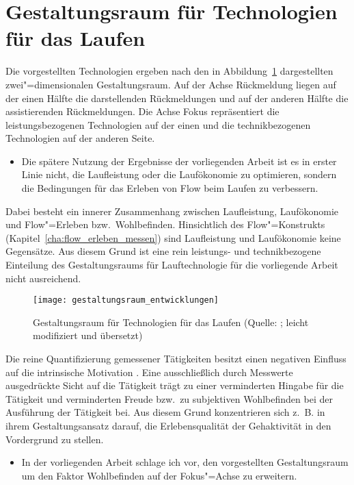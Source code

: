 

\section{Gestaltungsraum für Technologien für das Laufen} 

\label{sec:gestaltungsraum_fur_technologien_fur_das_laufen}

Die vorgestellten Technologien ergeben nach \citet{Jensen2014} den in Abbildung~\ref{fig:gestaltungsraum_entwicklungen} dargestellten zwei"=dimensionalen Gestaltungsraum. Auf der Achse Rückmeldung liegen auf der einen Hälfte die darstellenden Rückmeldungen und auf der anderen Hälfte die assistierenden Rückmeldungen. Die Achse Fokus repräsentiert die leistungsbezogenen Technologien auf der einen und die technikbezogenen Technologien auf der anderen Seite. 
\begin{itemize}
	
	\item Die spätere Nutzung der Ergebnisse der vorliegenden Arbeit ist es in erster Linie nicht, die Laufleistung oder die Laufökonomie zu optimieren, sondern die Bedingungen für das Erleben von Flow beim Laufen zu verbessern. 
\end{itemize}

Dabei besteht ein innerer Zusammenhang zwischen Laufleistung, Laufökonomie und Flow"=Erleben bzw.\ Wohlbefinden. Hinsichtlich des Flow"=Konstrukts (Kapitel~\ref{cha:flow_erleben_messen}) sind Laufleistung und Laufökonomie keine Gegensätze. Aus diesem Grund ist eine rein leistungs- und technikbezogene Einteilung des Gestaltungsraums für Lauftechnologie für die vorliegende Arbeit nicht ausreichend. 
\begin{figure}
	[!htb] \centering 
	\texttt{[image: gestaltungsraum\_entwicklungen]} \caption[Gestaltungsraum für Technologien für das Laufen]{Gestaltungsraum für Technologien für das Laufen (Quelle: \citet{Jensen2014}; leicht modifiziert und übersetzt)}\label{fig:gestaltungsraum_entwicklungen} 
\end{figure}

Die reine Quantifizierung gemessener Tätigkeiten besitzt einen negativen Einfluss auf die intrinsische Motivation \citep{Etkin2016}. Eine ausschließlich durch Messwerte ausgedrückte Sicht auf die Tätigkeit trägt zu einer verminderten Hingabe für die Tätigkeit und verminderten Freude bzw.\ zu subjektiven Wohlbefinden bei der Ausführung der Tätigkeit bei. Aus diesem Grund konzentrieren sich z.~B. \citet{Hajinejad2015} in ihrem Gestaltungsansatz darauf, die Erlebensqualität der Gehaktivität in den Vordergrund zu stellen. 
\begin{itemize}
	
	\item In der vorliegenden Arbeit schlage ich vor, den vorgestellten Gestaltungsraum um den Faktor Wohlbefinden auf der Fokus"=Achse zu erweitern. 
\end{itemize}

